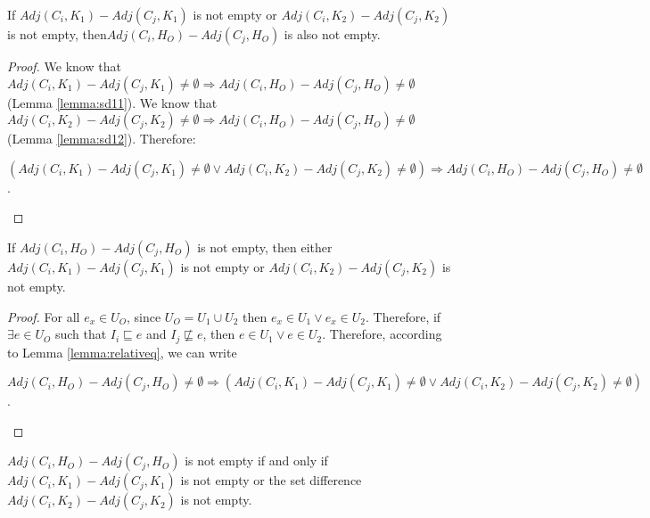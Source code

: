 \begin{lemma}\label{lemma:sd1}
If $Adj(C_{i}, K_{1}) - Adj(C_{j}, K_{1})$ is not  empty or $Adj(C_{i}, K_{2}) - Adj(C_{j}, K_{2})$ is not empty, then$Adj(C_{i}, H_{O}) - Adj(C_{j}, H_{O})$ is also not empty.
\end{lemma}

\begin{proof}
We know that $Adj(C_{i}, K_{1}) - Adj(C_{j}, K_{1}) \neq \emptyset \Rightarrow Adj(C_{i}, H_{O}) - Adj(C_{j}, H_{O}) \neq \emptyset$ (Lemma \ref{lemma:sd11}).
We know that $Adj(C_{i}, K_{2}) - Adj(C_{j}, K_{2}) \neq \emptyset \Rightarrow Adj(C_{i}, H_{O}) - Adj(C_{j}, H_{O}) \neq \emptyset$ (Lemma \ref{lemma:sd12}).
Therefore:

\begin{center}
$(Adj(C_{i}, K_{1}) - Adj(C_{j}, K_{1}) \neq \emptyset \vee Adj(C_{i}, K_{2}) - Adj(C_{j}, K_{2}) \neq \emptyset) \Rightarrow Adj(C_{i}, H_{O}) - Adj(C_{j}, H_{O}) \neq \emptyset$.
\end{center}
\end{proof}

\begin{lemma}\label{lemma:sd2}
If $Adj(C_{i}, H_{O}) - Adj(C_{j}, H_{O})$ is not empty, then either $Adj(C_{i}, K_{1}) - Adj(C_{j}, K_{1})$ is not empty or $Adj(C_{i}, K_{2}) - Adj(C_{j}, K_{2})$ is not empty.
\end{lemma}

\begin{proof}
For all $e_{x} \in U_{O}$, since $U_{O} = U_{1} \cup U_{2}$ then $e_{x} \in U_{1} \vee e_{x} \in U_{2}$. Therefore, if $\exists e \in U_{O}$ such that $I_{i} \sqsubseteq e$ and $I_{j} \not \sqsubseteq e$, then $e \in U_{1} \vee e \in U_{2}$. Therefore, according to Lemma \ref{lemma:relativeq}, we can write

\begin{center}
$Adj(C_{i}, H_{O}) - Adj(C_{j}, H_{O}) \neq \emptyset \Rightarrow (Adj(C_{i}, K_{1}) - Adj(C_{j}, K_{1}) \neq \emptyset \vee Adj(C_{i}, K_{2}) - Adj(C_{j}, K_{2}) \neq \emptyset)$.
\end{center}
\end{proof}

\begin{lemma}\label{lemma:sd}
$Adj(C_{i}, H_{O}) - Adj(C_{j}, H_{O})$ is not empty if and only if $Adj(C_{i}, K_{1}) - Adj(C_{j}, K_{1})$ is not empty or the set difference $Adj(C_{i}, K_{2}) - Adj(C_{j}, K_{2})$ is not empty.
\end{lemma}

